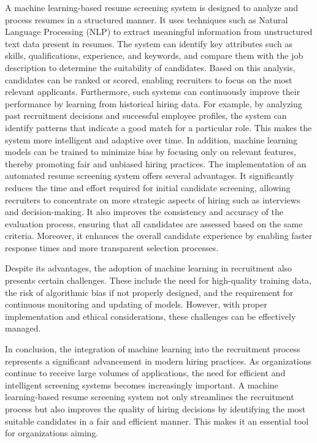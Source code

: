 \vspace{6pt}
{%
A machine learning-based resume screening system is designed to analyze and process resumes in a structured manner. It uses techniques such as Natural Language Processing (NLP) to extract meaningful information from unstructured text data present in resumes. The system can identify key attributes such as skills, qualifications, experience, and keywords, and compare them with the job description to determine the suitability of candidates. Based on this analysis, candidates can be ranked or scored, enabling recruiters to focus on the most relevant applicants.}
\vspace{6pt}
{%
Furthermore, such systems can continuously improve their performance by learning from historical hiring data. For example, by analyzing past recruitment decisions and successful employee profiles, the system can identify patterns that indicate a good match for a particular role. This makes the system more intelligent and adaptive over time. In addition, machine learning models can be trained to minimize bias by focusing only on relevant features, thereby promoting fair and unbiased hiring practices.}
\vspace{6pt}
{%
The implementation of an automated resume screening system offers several advantages. It significantly reduces the time and effort required for initial candidate screening, allowing recruiters to concentrate on more strategic aspects of hiring such as interviews and decision-making. It also improves the consistency and accuracy of the evaluation process, ensuring that all candidates are assessed based on the same criteria. Moreover, it enhances the overall candidate experience by enabling faster response times and more transparent selection processes.}

\vspace{6pt}
{%
Despite its advantages, the adoption of machine learning in recruitment also presents certain challenges. These include the need for high-quality training data, the risk of algorithmic bias if not properly designed, and the requirement for continuous monitoring and updating of models. However, with proper implementation and ethical considerations, these challenges can be effectively managed.}

\vspace{6pt}
{%
In conclusion, the integration of machine learning into the recruitment process represents a significant advancement in modern hiring practices. As organizations continue to receive large volumes of applications, the need for efficient and intelligent screening systems becomes increasingly important. A machine learning-based resume screening system not only streamlines the recruitment process but also improves the quality of hiring decisions by identifying the most suitable candidates in a fair and efficient manner. This makes it an essential tool for organizations aiming.}



